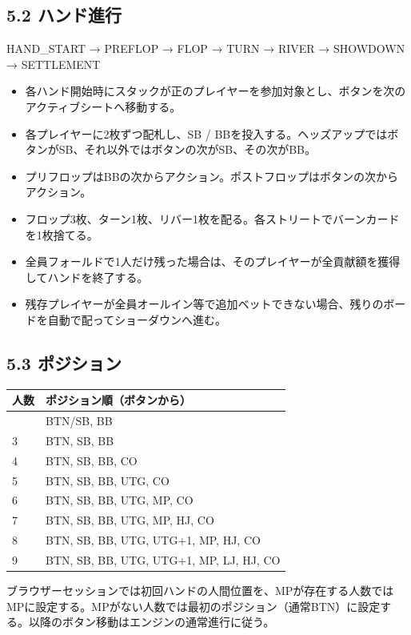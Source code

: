 \documentclass[
]{article}
\begin{document}
\subsection{5.2 ハンド進行}\label{ux30cfux30f3ux30c9ux9032ux884c}

HAND\_START → PREFLOP → FLOP → TURN → RIVER → SHOWDOWN → SETTLEMENT

\begin{itemize}
\item
  各ハンド開始時にスタックが正のプレイヤーを参加対象とし、ボタンを次のアクティブシートへ移動する。
\item
  各プレイヤーに2枚ずつ配札し、SB /
  BBを投入する。ヘッズアップではボタンがSB、それ以外ではボタンの次がSB、その次がBB。
\item
  プリフロップはBBの次からアクション。ポストフロップはボタンの次からアクション。
\item
  フロップ3枚、ターン1枚、リバー1枚を配る。各ストリートでバーンカードを1枚捨てる。
\item
  全員フォールドで1人だけ残った場合は、そのプレイヤーが全貢献額を獲得してハンドを終了する。
\item
  残存プレイヤーが全員オールイン等で追加ベットできない場合、残りのボードを自動で配ってショーダウンへ進む。
\end{itemize}

\subsection{5.3 ポジション}\label{ux30ddux30b8ux30b7ux30e7ux30f3}

\begin{longtable}[]{@{}ll@{}}
\toprule\noalign{}
人数 & ポジション順（ボタンから） \\
\midrule\noalign{}
\endhead
\bottomrule\noalign{}
\endlastfoot
2 & BTN/SB, BB \\
3 & BTN, SB, BB \\
4 & BTN, SB, BB, CO \\
5 & BTN, SB, BB, UTG, CO \\
6 & BTN, SB, BB, UTG, MP, CO \\
7 & BTN, SB, BB, UTG, MP, HJ, CO \\
8 & BTN, SB, BB, UTG, UTG+1, MP, HJ, CO \\
9 & BTN, SB, BB, UTG, UTG+1, MP, LJ, HJ, CO \\
\end{longtable}

ブラウザーセッションでは初回ハンドの人間位置を、MPが存在する人数ではMPに設定する。MPがない人数では最初のポジション（通常BTN）に設定する。以降のボタン移動はエンジンの通常進行に従う。
\end{document}

